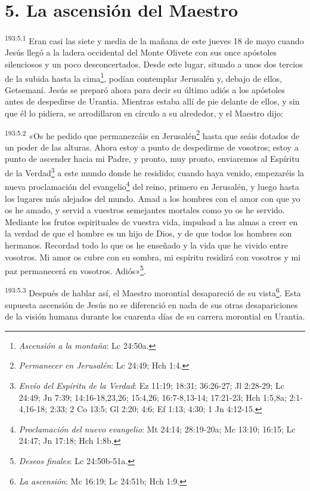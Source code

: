 \section*{5. La ascensión del Maestro}
\par
\textsuperscript{193:5.1} Eran casi las siete y media de la mañana de este jueves 18 de mayo cuando Jesús llegó a la ladera occidental del Monte Olivete con sus once apóstoles silenciosos y un poco desconcertados. Desde este lugar, situado a unos dos tercios de la subida hasta la cima\footnote{\textit{Ascensión a la montaña}: Lc 24:50a.}, podían contemplar Jerusalén y, debajo de ellos, Getsemaní. Jesús se preparó ahora para decir su último adiós a los apóstoles antes de despedirse de Urantia. Mientras estaba allí de pie delante de ellos, y sin que él lo pidiera, se arrodillaron en círculo a su alrededor, y el Maestro dijo:

\par
\textsuperscript{193:5.2} «Os he pedido que permanezcáis en Jerusalén\footnote{\textit{Permanecer en Jerusalén}: Lc 24:49; Hch 1:4.} hasta que seáis dotados de un poder de las alturas. Ahora estoy a punto de despedirme de vosotros; estoy a punto de ascender hacia mi Padre, y pronto, muy pronto, enviaremos al Espíritu de la Verdad\footnote{\textit{Envío del Espíritu de la Verdad}: Ez 11:19; 18:31; 36:26-27; Jl 2:28-29; Lc 24:49; Jn 7:39; 14:16-18,23,26; 15:4,26; 16:7-8,13-14; 17:21-23; Hch 1:5,8a; 2:1-4,16-18; 2:33; 2 Co 13:5; Gl 2:20; 4:6; Ef 1:13; 4:30; 1 Jn 4:12-15.} a este mundo donde he residido; cuando haya venido, empezaréis la nueva proclamación del evangelio\footnote{\textit{Proclamación del nuevo evangelio}: Mt 24:14; 28:19-20a; Mc 13:10; 16:15; Lc 24:47; Jn 17:18; Hch 1:8b.} del reino, primero en Jerusalén, y luego hasta los lugares más alejados del mundo. Amad a los hombres con el amor con que yo os he amado, y servid a vuestros semejantes mortales como yo os he servido. Mediante los frutos espirituales de vuestra vida, impulsad a las almas a creer en la verdad de que el hombre es un hijo de Dios, y de que todos los hombres son hermanos. Recordad todo lo que os he enseñado y la vida que he vivido entre vosotros. Mi amor os cubre con su sombra, mi espíritu residirá con vosotros y mi paz permanecerá en vosotros. Adiós»\footnote{\textit{Deseos finales}: Lc 24:50b-51a.}.

\par
\textsuperscript{193:5.3} Después de hablar así, el Maestro morontial desapareció de su vista\footnote{\textit{La ascensión}: Mc 16:19; Lc 24:51b; Hch 1:9.}. Esta supuesta ascensión de Jesús no se diferenció en nada de sus otras desapariciones de la visión humana durante los cuarenta días de su carrera morontial en Urantia.

